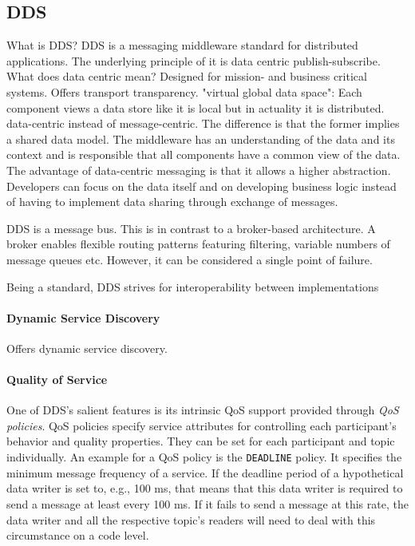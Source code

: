 \subsection{DDS}
What is DDS?
DDS is a messaging middleware standard for distributed applications. 
The underlying principle of it is data centric publish-subscribe.
What does data centric mean?
Designed for mission- and business critical systems.
Offers transport transparency.
"virtual global data space": Each component views a data store like it is local but in actuality it is distributed.
data-centric instead of message-centric. The difference is that the former implies a shared data model. The middleware has an understanding of the data and its context and is responsible that all components have a common view of the data.
The advantage of data-centric messaging is that it allows a higher abstraction. Developers can focus on the data itself and on developing business logic instead of having to implement data sharing through exchange of messages.

DDS is a message bus. This is in contrast to a broker-based architecture. A broker enables flexible routing patterns featuring filtering, variable numbers of message queues etc. However, it can be considered a single point of failure.

Being a standard, DDS strives for interoperability between implementations

\paragraph{Dynamic Service Discovery}
Offers dynamic service discovery.


\paragraph{Quality of Service}
One of DDS's salient features is its intrinsic QoS support provided through \emph{QoS policies}.
QoS policies specify service attributes for controlling each participant's behavior and quality properties. They can be set for each participant and topic individually. An example for a QoS policy is the \texttt{DEADLINE} policy. It specifies the minimum message frequency of a service. If the deadline period of a hypothetical data writer is set to, e.g., 100 ms, that means that this data writer is required to send a message at least every 100 ms. If it fails to send a message at this rate, the data writer and all the respective topic's readers will need to deal with this circumstance on a code level. 

